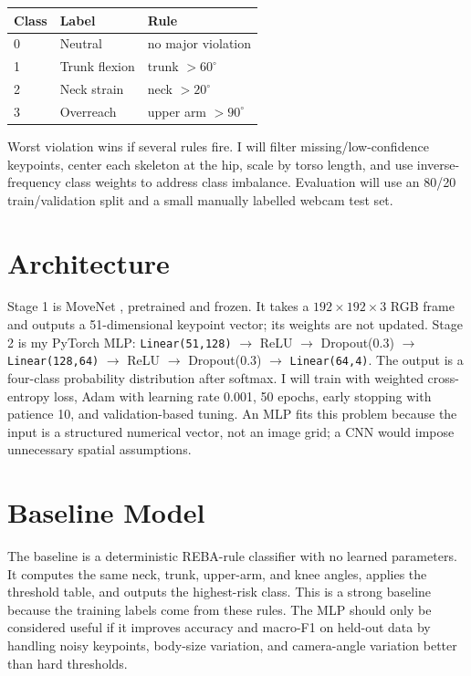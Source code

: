 \documentclass[final]{article}
\begin{document}
\begin{center}
\small
\begin{tabular}{lll}
\toprule
Class & Label & Rule \\
\midrule
0 & Neutral & no major violation \\
1 & Trunk flexion & trunk $>60^\circ$ \\
2 & Neck strain & neck $>20^\circ$ \\
3 & Overreach & upper arm $>90^\circ$ \\
\bottomrule
\end{tabular}
\end{center}
Worst violation wins if several rules fire. I will filter missing/low-confidence keypoints, center each skeleton at the hip, scale by torso length, and use inverse-frequency class weights to address class imbalance. Evaluation will use an 80/20 train/validation split and a small manually labelled webcam test set.

\section*{Architecture}
Stage 1 is MoveNet \citep{tensorflowmovenet}, pretrained and frozen. It takes a $192\times192\times3$ RGB frame and outputs a 51-dimensional keypoint vector; its weights are not updated. Stage 2 is my PyTorch MLP: \texttt{Linear(51,128)} $\rightarrow$ ReLU $\rightarrow$ Dropout(0.3) $\rightarrow$ \texttt{Linear(128,64)} $\rightarrow$ ReLU $\rightarrow$ Dropout(0.3) $\rightarrow$ \texttt{Linear(64,4)}. The output is a four-class probability distribution after softmax. I will train with weighted cross-entropy loss, Adam with learning rate 0.001, 50 epochs, early stopping with patience 10, and validation-based tuning. An MLP fits this problem because the input is a structured numerical vector, not an image grid; a CNN would impose unnecessary spatial assumptions.

\section*{Baseline Model}
The baseline is a deterministic REBA-rule classifier with no learned parameters. It computes the same neck, trunk, upper-arm, and knee angles, applies the threshold table, and outputs the highest-risk class. This is a strong baseline because the training labels come from these rules. The MLP should only be considered useful if it improves accuracy and macro-F1 on held-out data by handling noisy keypoints, body-size variation, and camera-angle variation better than hard thresholds.
\end{document}
